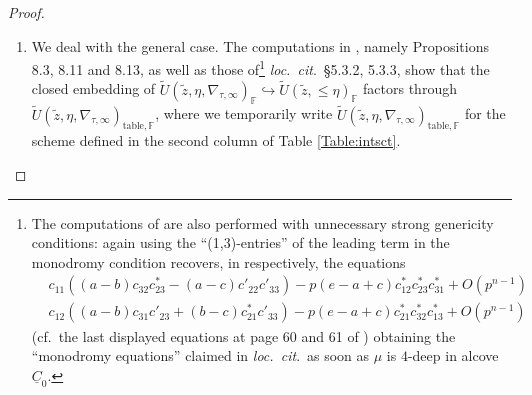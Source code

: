 \documentclass[oneside,a4paper,english, 11pt]{amsart}
\theoremstyle{plain}
\theoremstyle{plain}
\theoremstyle{plain}
\theoremstyle{plain}
\theoremstyle{plain}
\theoremstyle{plain}
\theoremstyle{definition}
\theoremstyle{definition}
\theoremstyle{definition}
\theoremstyle{remark}
\numberwithin{equation}{section}
\newcommand{\F}{\mathbb{F}}
\newcommand{\fP}{\mathfrak{P}}
\newcommand{\cC}{\mathcal{C}}
\newcommand{\cJ}{\mathcal{J}}
\newcommand{\un}[1]{\underline{#1}}
\newcommand{\tld}[1]{\widetilde{#1}}
\newcommand{\into}{\hookrightarrow}
\begin{document}
\begin{proof}
\begin{enumerate}
\begin{enumerate}
\item 
\label{it:pf:diag:1}
The composite of the top horizontal arrows identifies $\tld{\fP}_{\sigma,\tld{z}}$ with an non-empty open subscheme of $\tld{C}_{\sigma}^{\zeta}$; and
\item
\label{it:pf:diag:2}
$\cC_\kappa=\cC_\sigma$.
\end{enumerate}
For item (\ref{it:pf:diag:1}), we use \cite[Proposition 4.3.4, Proposition 4.3.5]{MLM}: one checks that according to Table \ref{Table:intsct}, the image of $\tld{\fP}_{\sigma,\tld{z}}$ along the top horizontal arrows is, in the notation of \emph{loc.~cit}., a $T_{\F}^{\vee,\cJ}$-torsor over 
\[
S_{\F}^{\nabla_0}(\tld{w}_1,\tld{w}_2,\tld{s})
\]
for suitable choices of $\tld{w}_1,\tld{w}_2$, and for $\tld{s}$ taken to be $t_{\mu+\eta}s$, and this is exactly an open subscheme of $\tld{C}_{\sigma}^\zeta$. 
%

For item (\ref{it:pf:diag:2}), we use the just established item (\ref{it:pf:diag:1}), and then use the same argument as in the third paragraph in the proof of \cite[Theorem 7.4.2]{MLM} to recognize that $\cC_{\kappa}$ is actually $\cC_{\sigma}$.
\item
\label{it:pf:diag:3}
We deal with the general case.
The computations in \cite[\S 8]{LLLM}, namely Propositions 8.3, 8.11 and 8.13, as well as those 
of\footnote{The computations of \cite[\S 5.3.2, 5.3.3]{LLLM} are also performed with unnecessary strong genericity conditions: again using the ``(1,3)-entries'' of the leading term in the monodromy condition recovers, in \cite[\S 5.3.2, 5.3.3]{LLLM} respectively, the equations
\begin{align*}
%
&c_{11}((a-b)c_{32}c^*_{23}-(a-c)c'_{22}c'_{33})-p(e-a+c)c^*_{12}c^*_{23}c^*_{31}+O(p^{n-1})\\
&c_{12}((a-b)c_{31}c'_{23}+(b-c)c^*_{21}c'_{33})-p(e-a+c)c^*_{21}c^*_{32}c^*_{13}+O(p^{n-1})
\end{align*}
(cf.~the last displayed equations at page 60 and 61 of \cite{LLLM})
obtaining the ``monodromy equations'' claimed in \emph{loc.~cit}.~as soon as $\mu$ is $4$-deep in alcove $\un{C}_0$.} \emph{loc.~cit}.~\S 5.3.2, 5.3.3, show that the closed embedding of $\tld{U}(\tld{z},\eta,\nabla_{\tau,\infty})_{\F}\into \tld{U}(\tld{z},\leq \eta)_{\F}$ factors through $\tld{U}(\tld{z},\eta,\nabla_{\tau,\infty})_{\mathrm{table},\F}$, where we temporarily write $\tld{U}(\tld{z},\eta,\nabla_{\tau,\infty})_{\mathrm{table},\F}$ for the scheme defined in the second column of Table \ref{Table:intsct}.


\end{enumerate}
\end{proof}
\end{document}
